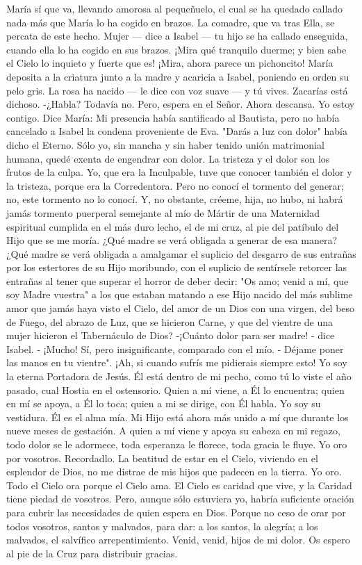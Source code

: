 \documentclass[12pt]{book} %
\begin{document}
María sí que va, llevando amorosa al pequeñuelo, el cual se ha quedado callado nada más que María lo ha cogido en 
brazos. La comadre, que va tras Ella, se percata de este hecho. 
Mujer — dice a Isabel — tu hijo se ha callado enseguida, cuando ella lo ha cogido en sus brazos. ¡Mira qué tranquilo 
duerme; y bien sabe el Cielo lo inquieto y fuerte que es! ¡Mira, ahora parece un pichoncito! 
María deposita a la criatura junto a la madre y acaricia a Isabel, poniendo en orden su pelo gris. 
La rosa ha nacido — le dice con voz suave — y tú vives. Zacarías está dichoso. 	 	-¿Habla? 
Todavía no. Pero, espera en el Señor. Ahora descansa. Yo estoy contigo. 
Dice María: 
Mi presencia había santificado al Bautista, pero no había cancelado a Isabel la condena proveniente de Eva. "Darás a 
luz con dolor" había dicho el Eterno. 
Sólo yo, sin mancha y sin haber tenido unión matrimonial humana, quedé exenta de engendrar con dolor. La tristeza y 
el dolor son los frutos de la culpa. Yo, que era la Inculpable, tuve que conocer también el dolor y la tristeza, porque era la Corredentora. Pero no conocí el tormento del generar; no, este tormento no lo conocí. 
Y, no obstante, créeme, hija, no hubo, ni habrá jamás tormento puerperal semejante al mío de Mártir de una Maternidad espiritual cumplida en el más duro lecho, el de mi cruz, al pie del patíbulo del Hijo que se me moría. ¿Qué madre se verá obligada a generar de esa manera? ¿Qué madre se verá obligada a amalgamar el suplicio del desgarro de sus entrañas por los estertores de su Hijo moribundo, con el suplicio de sentírsele retorcer las entrañas al tener que superar el horror de deber decir: "Os amo; venid a mí, que soy Madre vuestra" a los que estaban matando a ese Hijo nacido del más sublime amor que jamás haya visto el Cielo, del amor de un Dios con una virgen, del beso de Fuego, del abrazo de Luz, que se hicieron Carne, y que del vientre de una mujer hicieron el Tabernáculo de Dios? 
-¡Cuánto dolor para ser madre! - dice Isabel. - ¡Mucho! Sí, pero insignificante, comparado con el mío. 
- Déjame poner las manos en tu vientre". ¡Ah, si cuando sufrís me pidierais siempre esto! 
Yo soy la eterna Portadora de Jesús. Él está dentro de mi pecho, como tú lo viste el año pasado, cual Hostia en el 
ostensorio. Quien a mí viene, a Él lo encuentra; quien en mí se apoya, a Él lo toca; quien a mi se dirige, con Él habla. Yo soy su vestidura. Él es el alma mía. Mi Hijo está ahora más unido a mí que durante los nueve meses de gestación. A quien a mí viene y apoya su cabeza en mi regazo, todo dolor se le adormece, toda esperanza le florece, toda gracia le fluye. 
Yo oro por vosotros. Recordadlo. La beatitud de estar en el Cielo, viviendo en el esplendor de Dios, no me distrae de mis 
hijos que padecen en la tierra. Yo oro. Todo el Cielo ora porque el Cielo ama. El Cielo es caridad que vive, y la Caridad tiene piedad de vosotros. Pero, aunque sólo estuviera yo, habría suficiente oración para cubrir las necesidades de quien espera en Dios. Porque no ceso de orar por todos vosotros, santos y malvados, para dar: a los santos, la alegría; a los malvados, el salvífico arrepentimiento. 
Venid, venid, hijos de mi dolor. Os espero al pie de la Cruz para distribuir gracias.                     
 
\end{document}
